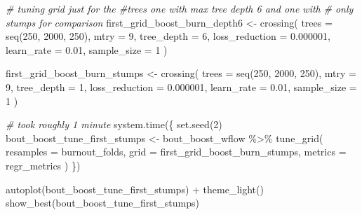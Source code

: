 \documentclass[
]{book}
\newenvironment{Shaded}{\begin{snugshade}}{\end{snugshade}}
\newcommand{\AttributeTok}[1]{\textcolor[rgb]{0.77,0.63,0.00}{#1}}
\newcommand{\CommentTok}[1]{\textcolor[rgb]{0.56,0.35,0.01}{\textit{#1}}}
\newcommand{\DecValTok}[1]{\textcolor[rgb]{0.00,0.00,0.81}{#1}}
\newcommand{\FloatTok}[1]{\textcolor[rgb]{0.00,0.00,0.81}{#1}}
\newcommand{\FunctionTok}[1]{\textcolor[rgb]{0.00,0.00,0.00}{#1}}
\newcommand{\NormalTok}[1]{#1}
\newcommand{\OtherTok}[1]{\textcolor[rgb]{0.56,0.35,0.01}{#1}}
\newcommand{\SpecialCharTok}[1]{\textcolor[rgb]{0.00,0.00,0.00}{#1}}
\begin{document}
\begin{Shaded}
\begin{Highlighting}[]
\CommentTok{\# tuning grid just for the \#trees one with max tree depth 6 and one with}
\CommentTok{\# only stumps for comparison}
\NormalTok{first\_grid\_boost\_burn\_depth6 }\OtherTok{\textless{}{-}} \FunctionTok{crossing}\NormalTok{(}
  \AttributeTok{trees =} \FunctionTok{seq}\NormalTok{(}\DecValTok{250}\NormalTok{, }\DecValTok{2000}\NormalTok{, }\DecValTok{250}\NormalTok{),}
  \AttributeTok{mtry =} \DecValTok{9}\NormalTok{,}
  \AttributeTok{tree\_depth =} \DecValTok{6}\NormalTok{,}
  \AttributeTok{loss\_reduction =} \FloatTok{0.000001}\NormalTok{,}
  \AttributeTok{learn\_rate =} \FloatTok{0.01}\NormalTok{,}
  \AttributeTok{sample\_size =} \DecValTok{1}
\NormalTok{)}

\NormalTok{first\_grid\_boost\_burn\_stumps }\OtherTok{\textless{}{-}} \FunctionTok{crossing}\NormalTok{(}
  \AttributeTok{trees =} \FunctionTok{seq}\NormalTok{(}\DecValTok{250}\NormalTok{, }\DecValTok{2000}\NormalTok{, }\DecValTok{250}\NormalTok{),}
  \AttributeTok{mtry =} \DecValTok{9}\NormalTok{,}
  \AttributeTok{tree\_depth =} \DecValTok{1}\NormalTok{,}
  \AttributeTok{loss\_reduction =} \FloatTok{0.000001}\NormalTok{,}
  \AttributeTok{learn\_rate =} \FloatTok{0.01}\NormalTok{,}
  \AttributeTok{sample\_size =} \DecValTok{1}
\NormalTok{)}
\end{Highlighting}
\end{Shaded}

\begin{Shaded}
\begin{Highlighting}[]
\CommentTok{\# took roughly 1 minute}
\FunctionTok{system.time}\NormalTok{(\{}
  \FunctionTok{set.seed}\NormalTok{(}\DecValTok{2}\NormalTok{)}
\NormalTok{  bout\_boost\_tune\_first\_stumps }\OtherTok{\textless{}{-}}\NormalTok{ bout\_boost\_wflow }\SpecialCharTok{\%\textgreater{}\%}
    \FunctionTok{tune\_grid}\NormalTok{(}
      \AttributeTok{resamples =}\NormalTok{  burnout\_folds,}
      \AttributeTok{grid =}\NormalTok{ first\_grid\_boost\_burn\_stumps,}
      \AttributeTok{metrics =}\NormalTok{ regr\_metrics}
\NormalTok{    )}
\NormalTok{\})}


\FunctionTok{autoplot}\NormalTok{(bout\_boost\_tune\_first\_stumps) }\SpecialCharTok{+} \FunctionTok{theme\_light}\NormalTok{()}
\FunctionTok{show\_best}\NormalTok{(bout\_boost\_tune\_first\_stumps)}
\end{Highlighting}
\end{Shaded}
\end{document}
